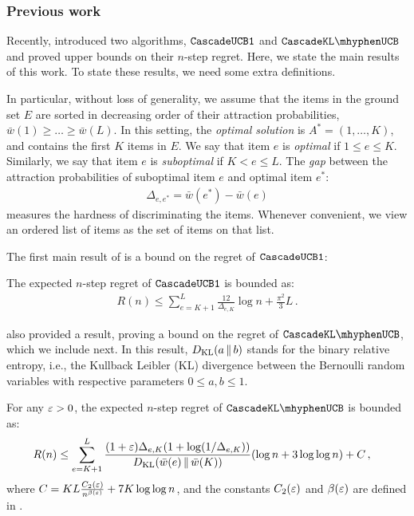 \subsubsection{Previous work}

Recently, \citet{kveton15cascade} introduced two algorithms,  ${\tt CascadeUCB1}$ and $\cascadeklucb$
and proved upper bounds on their $n$-step regret.
Here, we state the main results of this work.
To state these results, we need some extra definitions.

In particular, without loss of generality, we assume that the items in the ground set $E$
 are sorted in decreasing order of their attraction probabilities, $\bar{w}(1) \geq \ldots \geq \bar{w}(L)$. In this setting, the \emph{optimal solution} is $A^\ast = (1, \dots, K)$, and contains the first $K$ items in $E$. We say that item $e$ is \emph{optimal} if $1 \leq e \leq K$. Similarly, we say that item $e$ is \emph{suboptimal} if $K < e \leq L$. The \emph{gap} between the attraction probabilities of suboptimal item $e$ and optimal item $e^\ast$:
\begin{align}
  \Delta_{e, e^\ast} = \bar{w}(e^\ast) - \bar{w}(e)
  \label{eq:gap}
\end{align}
measures the hardness of discriminating the items. Whenever convenient, we view an ordered list of items as the set of items on that list.

The first main result of  \citet{kveton15cascade} is a bound on the regret of ${\tt CascadeUCB1}$:
\begin{theorem}
\label{thm:ucb1} The expected $n$-step regret of ${\tt CascadeUCB1}$ is bounded as:
\begin{align*}
  R(n) \leq
  \sum_{e = K + 1}^L \frac{12}{\Delta_{e, K}} \log n + \frac{\pi^2}{3} L\,.
\end{align*}
\end{theorem}

\citet{kveton15cascade}  also provided a result, proving a bound on the regret of $\cascadeklucb$, which we include next.
In this result, $D_\mathrm{KL}(a \,\|\, b)$ stands for the binary relative entropy, i.e., the Kullback Leibler (KL) divergence between the Bernoulli random variables with respective parameters $0\le a,b\le 1$.
\begin{theorem}
\label{thm:klucb} For any $\varepsilon > 0$, the expected $n$-step regret of $\cascadeklucb$ is bounded as:
\begin{align*}
  R(n)
  & \leq \sum_{e = K + 1}^L
  \frac{(1 + \varepsilon) \Delta_{e, K} (1 + \log(1 / \Delta_{e, K}))}{D_\mathrm{KL}(\bar{w}(e) \,\|\, \bar{w}(K))} (\log n + 3 \log \log n) + C\,,
\end{align*}
where $C = K L \frac{C_2(\varepsilon)}{n^{\beta(\varepsilon)}} + 7 K \log \log n$, and the constants $C_2(\varepsilon)$ and $\beta(\varepsilon)$ are defined in \citet{garivier11klucb}. 
\end{theorem}

